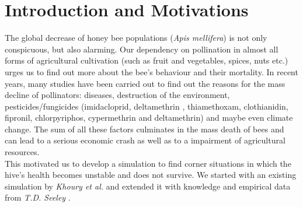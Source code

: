 \section{Introduction and Motivations}
The global decrease of honey bee populations (\textit{Apis mellifera}) is not only conspicuous, but also alarming. Our dependency on pollination in almost all forms of agricultural cultivation (such as fruit and vegetables, spices, nuts etc.) urges us to find out more about the bee's behaviour and their mortality. In recent years, many studies \cite{potts10} \cite{thomann13} have been carried out to find out the reasons for the mass decline of pollinators: diseases, destruction of the environment, pesticides/fungicides (imidacloprid, deltamethrin \cite{decourtye04}, thiamethoxam, clothianidin, fipronil, chlorpyriphos, cypermethrin and deltamethrin) and maybe even climate change. The sum of all these factors culminates in the mass death of bees and can lead to a serious economic crash as well as to a impairment of agricultural resources.\\
This motivated us to develop a simulation to find corner situations in which the hive's health becomes unstable and does not survive. We started with an existing simulation by \textit{Khoury et al.} \cite{khoury13} and extended it with knowledge and empirical data from \textit{T.D. Seeley} \cite{seeley95}.